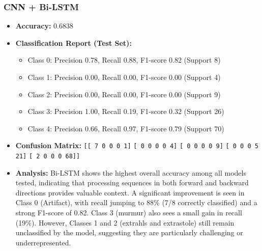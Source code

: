 \documentclass[a4paper]{article}
\begin{document}
\begin{multicols}{2}
\subsubsection{CNN + Bi-LSTM}
\begin{itemize}
    \item \textbf{Accuracy:} 0.6838 
    \item \textbf{Classification Report (Test Set):} 
        \begin{itemize}
            \item Class 0: Precision 0.78, Recall 0.88, F1-score 0.82 (Support 8)
            \item Class 1: Precision 0.00, Recall 0.00, F1-score 0.00 (Support 4)
            \item Class 2: Precision 0.00, Recall 0.00, F1-score 0.00 (Support 9)
            \item Class 3: Precision 1.00, Recall 0.19, F1-score 0.32 (Support 26)
            \item Class 4: Precision 0.66, Recall 0.97, F1-score 0.79 (Support 70)
        \end{itemize}
    \item \textbf{Confusion Matrix:} 
        \texttt{[[ 7 0 0 0 1]}
        \texttt{[ 0 0 0 0 4]}
        \texttt{[ 0 0 0 0 9]}
        \texttt{[ 0 0 0 5 21]}
        \texttt{[ 2 0 0 0 68]]}
    \item \textbf{Analysis:} Bi-LSTM shows the highest overall accuracy among all models tested, indicating that processing sequences in both forward and backward directions provides valuable context. A significant improvement is seen in Class 0 (Artifact), with recall jumping to 88\% (7/8 correctly classified) and a strong F1-score of 0.82. Class 3 (murmur) also sees a small gain in recall (19\%). However, Classes 1 and 2 (extrahls and extrastole) still remain unclassified by the model, suggesting they are particularly challenging or underrepresented.

\end{itemize}


\end{multicols}
\end{document}
